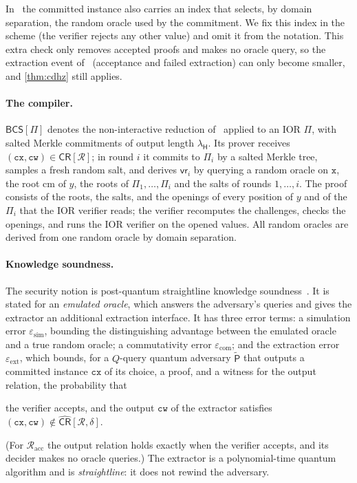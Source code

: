 In~\cite{CDHZ25} the committed instance also carries an index that selects, by domain separation, the random oracle used by the commitment. We fix this index in the scheme (the verifier rejects any other value) and omit it from the notation. This extra check only removes accepted proofs and makes no oracle query, so the extraction event of~\cite[Definition~10.3]{CDHZ25} (acceptance and failed extraction) can only become smaller, and \cref{thm:cdhz} still applies.

\paragraph{The compiler.}
$\mathsf{BCS}[\Pi]$ denotes the non-interactive reduction of~\cite[Construction~11.7]{CDHZ25} applied to an IOR $\Pi$, with salted Merkle commitments of output length $\lambda_{\mathsf{H}}$.
Its prover receives $(\mathtt{cx}, \mathtt{cw}) \in \mathsf{CR}[\mathcal{R}]$; in round $i$ it commits to $\Pi_i$ by a salted Merkle tree, samples a fresh random salt, and derives $\mathsf{vr}_i$ by querying a random oracle on $\mathtt{x}$, the root $\mathrm{cm}$ of $y$, the roots of $\Pi_1,\dots,\Pi_i$ and the salts of rounds $1,\dots,i$.
The proof consists of the roots, the salts, and the openings of every position of $y$ and of the $\Pi_i$ that the IOR verifier reads; the verifier recomputes the challenges, checks the openings, and runs the IOR verifier on the opened values.
All random oracles are derived from one random oracle by domain separation.

\paragraph{Knowledge soundness.}
The security notion is post-quantum straightline knowledge soundness~\cite[Definition~10.3]{CDHZ25}.
It is stated for an \emph{emulated oracle}, which answers the adversary's queries and gives the extractor an additional extraction interface.
It has three error terms: a simulation error $\varepsilon_{\mathrm{sim}}$, bounding the distinguishing advantage between the emulated oracle and a true random oracle; a commutativity error $\varepsilon_{\mathrm{com}}$; and the extraction error $\varepsilon_{\mathrm{ext}}$, which bounds, for a $Q$-query quantum adversary $\tilde{\mathsf{P}}$ that outputs a committed instance $\mathtt{cx}$ of its choice, a proof, and a witness for the output relation, the probability that
\begin{center}
the verifier accepts, \quad and \quad the output $\mathtt{cw}$ of the extractor satisfies $(\mathtt{cx}, \mathtt{cw}) \notin \widehat{\mathsf{CR}}[\mathcal{R}, \delta]$.
\end{center}
(For $\mathcal{R}_{\mathrm{acc}}$ the output relation holds exactly when the verifier accepts, and its decider makes no oracle queries.)
The extractor is a polynomial-time quantum algorithm and is \emph{straightline}: it does not rewind the adversary.


